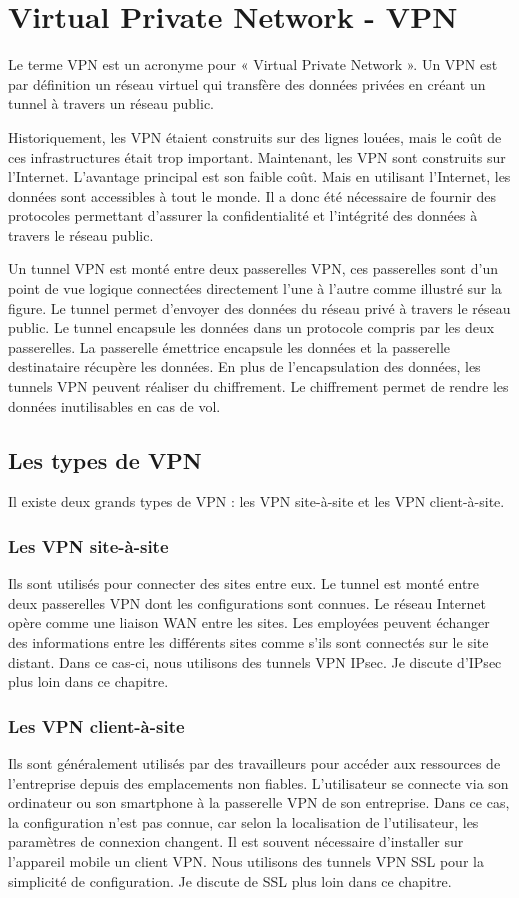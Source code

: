 \section{Virtual Private Network - VPN}
Le terme VPN est un acronyme pour « Virtual Private Network ».
Un VPN est par définition un réseau virtuel qui transfère des données privées en créant un tunnel à travers un réseau public.

Historiquement, les VPN étaient construits sur des lignes louées, mais le coût de ces infrastructures était trop important.
Maintenant, les VPN sont construits sur l'Internet.
L'avantage principal est son faible coût.
Mais en utilisant l'Internet, les données sont accessibles à tout le monde. 
Il a donc été nécessaire de fournir des protocoles permettant d'assurer la confidentialité et l'intégrité des données à travers le réseau public. 

Un tunnel VPN est monté entre deux passerelles VPN, ces passerelles sont d'un point de vue logique connectées directement l'une à l'autre comme illustré sur la figure. 
Le tunnel permet d'envoyer des données du réseau privé à travers le réseau public.
Le tunnel encapsule les données dans un protocole compris par les deux passerelles. 
La passerelle émettrice encapsule les données et la passerelle destinataire récupère les données. 
En plus de l'encapsulation des données, les tunnels VPN peuvent réaliser du chiffrement. 
Le chiffrement permet de rendre les données  inutilisables en cas de vol. 

\subsection{Les types de VPN}
Il existe deux grands types de VPN : les VPN site-à-site et les VPN client-à-site.  

\subsubsection{Les VPN site-à-site} 
Ils sont utilisés pour connecter des sites entre eux. 
Le tunnel est monté entre deux passerelles VPN dont les configurations sont connues. 
Le réseau Internet opère comme une liaison WAN entre les sites. 
Les employées peuvent échanger des informations entre les différents sites comme s'ils sont connectés sur le site distant. 
Dans ce cas-ci, nous utilisons des tunnels VPN IPsec. 
Je discute d'IPsec plus loin dans ce chapitre. 

\subsubsection{Les VPN client-à-site} 
Ils sont généralement utilisés par des travailleurs pour accéder aux ressources de l'entreprise depuis des emplacements non fiables.  
L'utilisateur se connecte via son ordinateur ou son smartphone à la passerelle VPN de son entreprise.  
Dans ce cas, la configuration n'est pas connue, car selon la localisation de l'utilisateur, les paramètres de connexion changent.  
Il est souvent nécessaire d'installer sur l'appareil mobile un client VPN. 
Nous utilisons des tunnels VPN SSL pour la simplicité de configuration. 
Je discute de SSL plus loin dans ce chapitre.

